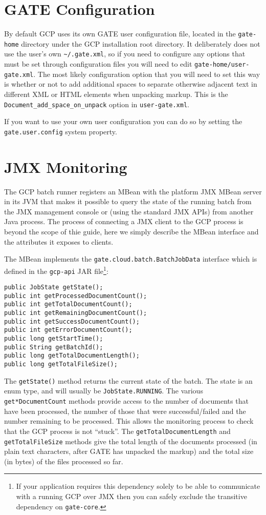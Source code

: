 \section{GATE Configuration}

By default GCP uses its own GATE user configuration file, located in the
\verb!gate-home! directory under the GCP installation root directory.  It
deliberately does not use the user's own \verb!~/.gate.xml!, so if you need to
configure any options that must be set through configuration files you will
need to edit \verb!gate-home/user-gate.xml!.  The most likely configuration
option that you will need to set this way is whether or not to add additional
spaces to separate otherwise adjacent text in different XML or HTML elements
when unpacking markup.  This is the \verb!Document_add_space_on_unpack! option
in \verb!user-gate.xml!.

If you want to use your own user configuration you can do so by setting the
\verb|gate.user.config| system property.

\section{JMX Monitoring}

The GCP batch runner registers an MBean with the platform JMX MBean server in
its JVM that makes it possible to query the state of the running batch from the
JMX management console or (using the standard JMX APIs) from another Java
process.  The process of connecting a JMX client to the GCP process is beyond
the scope of thie guide, here we simply describe the MBean interface and the
attributes it exposes to clients.

The MBean implements the \verb!gate.cloud.batch.BatchJobData! interface which
is defined in the \verb!gcp-api! JAR file\footnote{If your application requires
this dependency solely to be able to communicate with a running GCP over JMX then
you can safely exclude the transitive dependency on \texttt{gate-core}.}:

\begin{lstlisting}[breaklines]
public JobState getState();
public int getProcessedDocumentCount();
public int getTotalDocumentCount();
public int getRemainingDocumentCount();
public int getSuccessDocumentCount();
public int getErrorDocumentCount();
public long getStartTime();
public String getBatchId();
public long getTotalDocumentLength();
public long getTotalFileSize();
\end{lstlisting}

The \verb!getState()! method returns the current state of the batch.  The state
is an enum type, and will usually be \verb!JobState.RUNNING!.  The various
\verb!get*DocumentCount! methods provide access to the number of documents that
have been processed, the number of those that were successful/failed and the
number remaining to be processed.  This allows the monitoring process to check
that the GCP process is not ``stuck''.  The \verb!getTotalDocumentLength! and
\verb!getTotalFileSize! methods give the total length of the documents
processed (in plain text characters, after GATE has unpacked the markup) and
the total size (in bytes) of the files processed so far.

